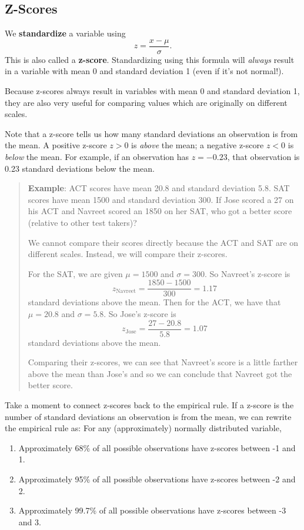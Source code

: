 \documentclass[
]{book}
\providecommand{\tightlist}{%
  \setlength{\itemsep}{0pt}\setlength{\parskip}{0pt}}
\begin{document}
\subsection{Z-Scores}\label{z-scores}

We \textbf{standardize} a variable using \[z = \frac{x-\mu}{\sigma}.\] This is also called a \textbf{z-score}. Standardizing using this formula will \emph{always} result in a variable with mean 0 and standard deviation 1 (even if it's not normal!).

Because z-scores always result in variables with mean 0 and standard deviation 1, they are also very useful for comparing values which are originally on different scales.

Note that a z-score tells us how many standard deviations an observation is from the mean. A positive z-score \(z>0\) is \emph{above} the mean; a negative z-score \(z<0\) is \emph{below} the mean. For example, if an observation has \(z=-0.23\), that observation is 0.23 standard deviations below the mean.

\begin{quote}
\textbf{Example}: ACT scores have mean 20.8 and standard deviation 5.8. SAT scores have mean 1500 and standard deviation 300. If Jose scored a 27 on his ACT and Navreet scored an 1850 on her SAT, who got a better score (relative to other test takers)?

We cannot compare their scores directly because the ACT and SAT are on different scales. Instead, we will compare their z-scores.

For the SAT, we are given \(\mu = 1500\) and \(\sigma = 300\). So Navreet's z-score is
\[z_{\text{Navreet}} = \frac{1850-1500}{300} = 1.17\]
standard deviations above the mean.
Then for the ACT, we have that \(\mu=20.8\) and \(\sigma=5.8\). So Jose's z-score is
\[z_{\text{Jose}} = \frac{27-20.8}{5.8} = 1.07\]
standard deviations above the mean.

Comparing their z-scores, we can see that Navreet's score is a little farther above the mean than Jose's and so we can conclude that Navreet got the better score.
\end{quote}

Take a moment to connect z-scores back to the empirical rule. If a z-score is the number of standard deviations an observation is from the mean, we can rewrite the empirical rule as: For any (approximately) normally distributed variable,

\begin{enumerate}
\def\labelenumi{\arabic{enumi}.}
\tightlist
\item
  Approximately 68\% of all possible observations have z-scores between -1 and 1.
\item
  Approximately 95\% of all possible observations have z-scores between -2 and 2.
\item
  Approximately 99.7\% of all possible observations have z-scores between -3 and 3.
\end{enumerate}
\end{document}
